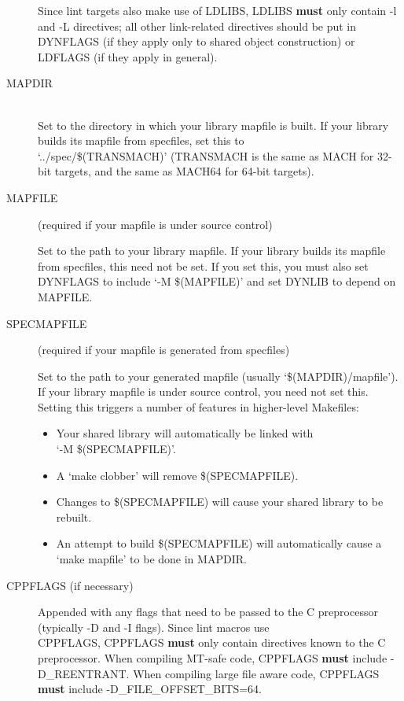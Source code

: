 \documentclass{article}
\begin{document}
\begin{description}
  Since lint targets also make use of LDLIBS, LDLIBS {\bf must} only contain -l and
  -L directives; all other link-related directives should be put in DYNFLAGS (if
  they apply only to shared object construction) or LDFLAGS (if they apply in
  general).

\item[MAPDIR] \hfill \\
  Set to the directory in which your library mapfile is built. If your library
  builds its mapfile from specfiles, set this to \\ `../spec/\$(TRANSMACH)'
  (TRANSMACH is the same as MACH for 32-bit targets, and the same as MACH64 for
  64-bit targets).

\item[MAPFILE] (required if your mapfile is under source control)

  Set to the path to your library mapfile. If your library builds its mapfile
  from specfiles, this need not be set. If you set this, you must also set
  DYNFLAGS to include `-M \$(MAPFILE)' and set DYNLIB to depend on MAPFILE.

\item[SPECMAPFILE] (required if your mapfile is generated from specfiles)

  Set to the path to your generated mapfile (usually `\$(MAPDIR)/mapfile'). If
  your library mapfile is under source control, you need not set this. Setting
  this triggers a number of features in higher-level Makefiles:

  \begin{itemize}
  \item Your shared library will automatically be linked with \\ `-M \$(SPECMAPFILE)'.
  \item A `make clobber' will remove \$(SPECMAPFILE).
  \item Changes to \$(SPECMAPFILE) will cause your shared library to be rebuilt.
  \item An attempt to build \$(SPECMAPFILE) will automatically cause a `make mapfile' to
  be done in MAPDIR.
  \end{itemize}


\item[CPPFLAGS (if necessary)] \hfill

  Appended with any flags that need to be passed to the C preprocessor (typically
  -D and -I flags). Since lint macros use \\ CPPFLAGS, CPPFLAGS {\bf must} only
  contain directives known to the C preprocessor. When compiling MT-safe code,
  CPPFLAGS {\bf must} include -D\_REENTRANT. When compiling large file aware code,
  CPPFLAGS {\bf must} include -D\_FILE\_OFFSET\_BITS=64.


\end{description}
\end{document}
